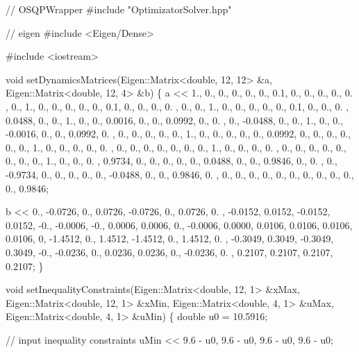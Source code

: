 \begin{DoxyCodeInclude}

\textcolor{comment}{// OSQPWrapper}
\textcolor{preprocessor}{#include "OptimizatorSolver.hpp"}

\textcolor{comment}{// eigen}
\textcolor{preprocessor}{#include <Eigen/Dense>}

\textcolor{preprocessor}{#include <iostream>}

\textcolor{keywordtype}{void} setDynamicsMatrices(Eigen::Matrix<double, 12, 12> &a, Eigen::Matrix<double, 12, 4> &b)
\{
    a << 1.,      0.,     0., 0., 0., 0., 0.1,     0.,     0.,  0.,     0.,     0.    ,
        0.,      1.,     0., 0., 0., 0., 0.,      0.1,    0.,  0.,     0.,     0.    ,
        0.,      0.,     1., 0., 0., 0., 0.,      0.,     0.1, 0.,     0.,     0.    ,
        0.0488,  0.,     0., 1., 0., 0., 0.0016,  0.,     0.,  0.0992, 0.,     0.    ,
        0.,     -0.0488, 0., 0., 1., 0., 0.,     -0.0016, 0.,  0.,     0.0992, 0.    ,
        0.,      0.,     0., 0., 0., 1., 0.,      0.,     0.,  0.,     0.,     0.0992,
        0.,      0.,     0., 0., 0., 0., 1.,      0.,     0.,  0.,     0.,     0.    ,
        0.,      0.,     0., 0., 0., 0., 0.,      1.,     0.,  0.,     0.,     0.    ,
        0.,      0.,     0., 0., 0., 0., 0.,      0.,     1.,  0.,     0.,     0.    ,
        0.9734,  0.,     0., 0., 0., 0., 0.0488,  0.,     0.,  0.9846, 0.,     0.    ,
        0.,     -0.9734, 0., 0., 0., 0., 0.,     -0.0488, 0.,  0.,     0.9846, 0.    ,
        0.,      0.,     0., 0., 0., 0., 0.,      0.,     0.,  0.,     0.,     0.9846;

    b << 0.,      -0.0726,  0.,     0.0726,
        -0.0726,  0.,      0.0726, 0.    ,
        -0.0152,  0.0152, -0.0152, 0.0152,
        -0.,     -0.0006, -0.,     0.0006,
        0.0006,   0.,     -0.0006, 0.0000,
        0.0106,   0.0106,  0.0106, 0.0106,
        0,       -1.4512,  0.,     1.4512,
        -1.4512,  0.,      1.4512, 0.    ,
        -0.3049,  0.3049, -0.3049, 0.3049,
        -0.,     -0.0236,  0.,     0.0236,
        0.0236,   0.,     -0.0236, 0.    ,
        0.2107,   0.2107,  0.2107, 0.2107;
\}


\textcolor{keywordtype}{void} setInequalityConstraints(Eigen::Matrix<double, 12, 1> &xMax, Eigen::Matrix<double, 12, 1> &xMin,
                              Eigen::Matrix<double, 4, 1> &uMax, Eigen::Matrix<double, 4, 1> &uMin)
\{
    \textcolor{keywordtype}{double} u0 = 10.5916;

    \textcolor{comment}{// input inequality constraints}
    uMin << 9.6 - u0,
        9.6 - u0,
        9.6 - u0,
        9.6 - u0;


\end{DoxyCodeInclude}
